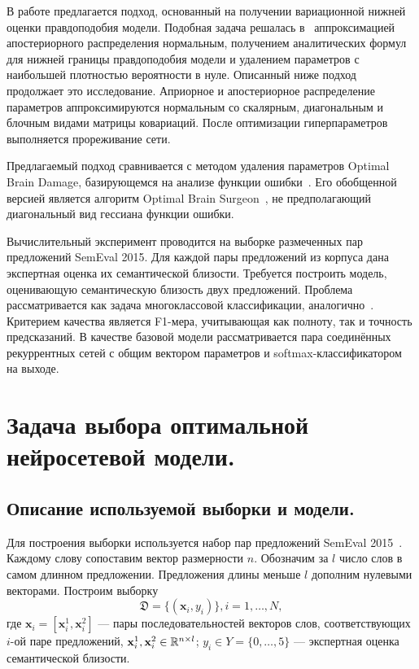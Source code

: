 \documentclass[12pt, fleqn, unicode]{article}
\newcommand{\DD}{{\mathfrak{D}}}
\newcommand{\bx}{{\textbf{x}}}
\begin{document}
В работе предлагается подход, основанный на получении вариационной нижней оценки правдоподобия модели. Подобная задача решалась в~\cite{Graves} аппроксимацией апостериорного распределения нормальным, получением аналитических формул для нижней границы правдоподобия модели и удалением параметров с наибольшей плотностью вероятности в нуле. Описанный ниже подход продолжает это исследование. Априорное и апостериорное распределение параметров аппроксимируются нормальным со скалярным, диагональным и блочным видами матрицы ковариаций. После оптимизации гиперпараметров выполняется прореживание сети. 

Предлагаемый подход сравнивается с методом удаления параметров Optimal Brain Damage, базирующемся на анализе функции ошибки~\cite{OBD}. Его обобщенной версией является алгоритм Optimal Brain Surgeon~\cite{OBS}, не предполагающий диагональный вид гессиана функции ошибки.

Вычислительный эксперимент проводится на выборке размеченных пар предложений SemEval 2015. Для каждой пары предложений из корпуса дана экспертная оценка их семантической близости. Требуется построить модель, оценивающую семантическую близость двух предложений. Проблема рассматривается как задача многоклассовой классификации, аналогично~\cite{Sanborn}. Критерием качества является F1-мера, учитывающая как полноту, так и точность предсказаний.
В качестве базовой модели рассматривается пара соединённых рекуррентных сетей с общим вектором параметров и softmax-классификатором на выходе.

\newpage
\section{Задача выбора оптимальной нейросетевой модели.}

\subsection{Описание используемой выборки и модели.}
Для построения выборки используется набор пар предложений SemEval 2015~\cite{SemEval2015}.
Каждому слову сопоставим вектор размерности $n$.
Обозначим за $l$ число слов в самом длинном предложении. Предложения длины меньше $l$ дополним нулевыми векторами. 
Построим выборку
$$ \DD = \{(\bx_i,y_i)\}, i = 1,\dots,N,$$
где $\bx_i = [\bx_i^1,\bx_i^2]$ --- пары последовательностей векторов слов, соответствующих $i$-ой паре предложений, $\bx_i^1, \bx_i^2 \in \RR^{n\times l}$;
$y_i \in Y = \{0,\dots,5\}$ --- экспертная оценка семантической близости. 
\end{document}
